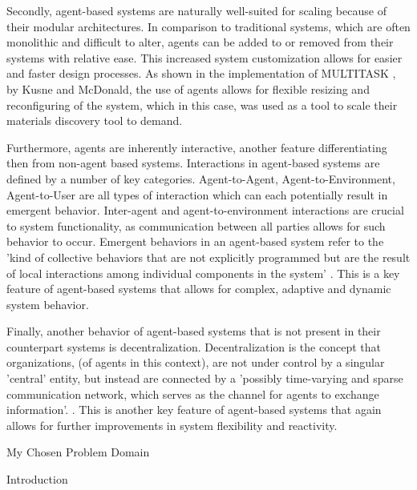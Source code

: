 \documentclass[a4paper,9pt]{scrartcl}
\makeatletter
\renewcommand{\subsection}{\@startsection{subsection}{2}{0mm}
  {0.25\baselineskip} 
  {0.25\baselineskip} 
  {\normalfont\normalsize\bfseries}}
\renewcommand{\section}{\@startsection{section}{1}{0mm}
  {1.5\baselineskip}
  {1\baselineskip} 
  {\normalfont\Large\bfseries}}
\makeatother
\begin{document}
Secondly, agent-based systems are naturally well-suited for scaling because of their
modular architectures. In comparison to traditional systems, which are often monolithic 
and difficult to alter, agents can be added to or removed from their systems with 
relative ease. This increased system customization allows for easier and faster design
processes. As shown in the implementation of MULTITASK 
\cite{kusneScalableMultiagentLab2023}, by Kusne and McDonald, the use of agents allows 
for flexible resizing and reconfiguring of the system, which in this case, was used 
as a tool to scale their materials discovery tool to demand. 

Furthermore, agents are inherently interactive, another feature 
differentiating then from non-agent based systems. Interactions in agent-based systems
are defined by a number of key categories. Agent-to-Agent, Agent-to-Environment, Agent-to-User are all 
types of interaction which can each potentially result in emergent behavior. Inter-agent and agent-to-environment 
interactions are crucial to system functionality, as communication between all parties allows for 
such behavior to occur. Emergent behaviors in an agent-based system refer to the 'kind 
of collective behaviors that are not explicitly programmed but are the result of local interactions
among individual components in the system' \cite{yangAutomaticRecognitionCollective2023}. 
This is a key feature of agent-based systems that allows for complex, adaptive and dynamic system behavior. 

Finally, another behavior of agent-based systems that is not present in their
counterpart systems is decentralization. Decentralization is the concept that 
organizations, (of agents in this context), are not under control by a singular 'central'
entity, but instead are connected by a 'possibly time-varying and sparse communication 
network, which serves as the channel for agents to exchange information'.
\cite{zhangFullyDecentralizedMultiAgent2018}. This is another key feature of agent-based systems
that again allows for further improvements in system flexibility and reactivity. 


\section{My Chosen Problem Domain}

\subsection{Introduction}
\end{document}
